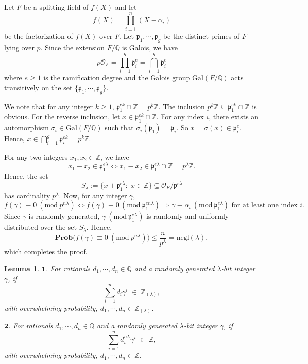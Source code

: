 \documentclass[11pt, lettersize, notitlepage, leqno, footskip=0.6cm]{article}
\newcommand{\bz}{\mathbb Z}
\newcommand{\bq}{\mathbb Q}
\newcommand{\pl}{\prod\limits}
\newcommand{\slim}{\sum\limits}
\newcommand{\Gal}{\mathrm{Gal}}
\newcommand{\negl}{\mr{negl}}
\newcommand{\LRA}{\Longleftrightarrow}
\newcommand{\mc}{\mathcal}
\newcommand{\mbf}{\mathbf}
\newcommand{\mr}{\mathrm}
\newcommand{\mfp}{\mathfrak{p}}
\newcommand{\al}{\alpha}
\newcommand{\lam}{\lambda}
\newcommand{\bzlam}{\bz_{(\lam)}}
\newcommand{\sub}{\subseteq}
\newcommand{\vs}{\vspace{-0.15cm}}
\newcommand{\noin}{\noindent}
\newcommand{\op}{overwhelming probability}
\newcommand{\Mod}[1]{\ (\mathrm{mod}\ #1)}
\newtheorem{Lem}[Thm]{Lemma}
\numberwithin{equation}{section}
\begin{document}
\begin{prf} Let $F$ be a splitting field of $f(X)$ and let \vs $${f}(X) = \pl_{i=1}^n (X-\al_i)$$ be the factorization of ${f}(X)$ over $F$. Let $\mfp_{1},\cdots,\mfp_g$ be the distinct primes of $F$ lying over $p$. Since the extension $F/\bq$ is Galois, we have \vs $$p\mc{O}_F = \pl_{i=1}^{g} \mfp_i^e = \bigcap\limits_{i=1}^{g} \mfp_i^e$$ where $e\geq 1$ is the ramification degree and the Galois group $\Gal(F/\bq)$ acts transitively on the set $\{ \mfp_1,\cdots,\mfp_g\}$.

We note that for any integer $k\geq 1$, $\mfp_1^{ek}\cap \bz = p^{k}\bz$. The inclusion $p^{k}\bz\sub \mfp_1^{ek}\cap \bz$ is obvious. For the reverse inclusion, let $x\in \mfp_1^{ek}\cap \bz$. For any index $i$, there exists an automorphism $\sigma_i\in \Gal(F/\bq)$ such that $\sigma_i(\mfp_1) = \mfp_i$. So $x = \sigma(x) \in \mfp_i^e$. Hence, $x\in \bigcap\limits_{i=1}^g \mfp_i^{ek} = p^{k}\bz$.

For any two integers $x_1,x_2\in \bz$, we have \vs $$x_1-x_2\in \mfp_1^{e\lam}\LRA x_1-x_2\in \mfp_1^{e\lam}\cap \bz = p^{\lam}\bz.$$ Hence, the set \vs $$ S_{\lam}:= \{x + {\mfp_1^{e\lam}}:\;x\in\bz \}\sub \mc{O}_F/\mfp^{e\lam} $$ has cardinality $p^{\lam}$. Now, for any integer $\gamma$, \vs $$f(\gamma)\equiv 0 \Mod{p^{n\lam}} \LRA f(\gamma)\equiv 0 \Mod{\mfp_1^{en\lam}}  \Longrightarrow \gamma\equiv \al_i \Mod{\mfp_1^{e\lam}}\text{ for at least one index } i. $$  Since $\gamma$ is randomly generated, $\gamma\Mod{\mfp_1^{e\lam}}$ is randomly and uniformly distributed over the set $S_{\lam}$. Hence, \vs $$ \mbf{Prob}\big( f(\gamma)\equiv 0 \Mod{p^{n\lam}} \big)\leq \frac{n}{p^{\lam}} = \negl(\lam),$$ which completes the proof.\end{prf}

\begin{Lem}$\mbf{1}$. For rationals $d_1,\cdots, d_n\in \bq$ and a randomly generated $\lam$-bit integer $\gamma$, if \vs$$\sum\limits_{i=1}^n d_i\gamma^i\; \in \;\bzlam,$$ with \op, $d_1,\cdots, d_n\in \bzlam$.\vspace{0.1cm}

\noin $\mbf{2}$. For rationals $d_1,\cdots, d_n\in \bq$ and a randomly generated $\lam$-bit integer $\gamma$, if \vs $$\slim_{i=1}^n d_i^{n\lam}\gamma^i\; \in \;\bz,$$ with \op, $d_1,\cdots, d_n\in \bz$.\end{Lem}
\end{document}
